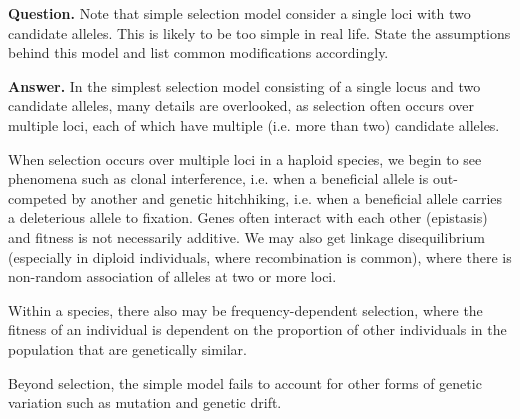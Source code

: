 \textbf{Question.} Note that simple selection model consider a single loci with two candidate alleles. This is likely to be too simple in real life. State the assumptions behind this model and list common modifications accordingly.

\textbf{Answer.} In the simplest selection model consisting of a single locus and two candidate alleles, many details are overlooked, as selection often occurs over multiple loci, each of which have multiple (i.e. more than two) candidate alleles.

When selection occurs over multiple loci in a haploid species, we begin to see phenomena such as clonal interference, i.e. when a beneficial allele is out-competed by another and genetic hitchhiking, i.e. when a beneficial allele carries a deleterious allele to fixation. Genes often interact with each other (epistasis) and fitness is not necessarily additive. We may also get linkage disequilibrium (especially in diploid individuals, where recombination is common), where there is non-random association of alleles at two or more loci.

Within a species, there also may be frequency-dependent selection, where the fitness of an individual is dependent on the proportion of other individuals in the population that are genetically similar.

Beyond selection, the simple model fails to account for other forms of genetic variation such as mutation and genetic drift.

